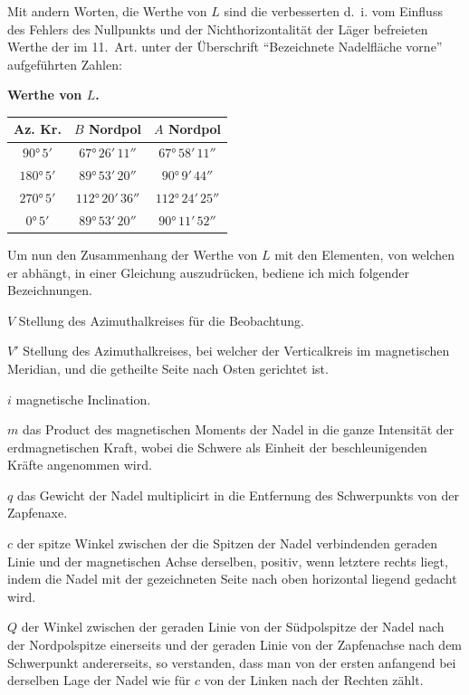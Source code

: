 \documentclass[12pt,a4paper]{article}
\begin{document}
Mit andern Worten, die Werthe von $L$ sind die verbesserten d.~i. vom Einfluss des Fehlers des Nullpunkts und der Nichthorizontalität der Läger befreieten Werthe der im 11.~Art. unter der Überschrift ``Bezeichnete Nadelfläche vorne'' aufgeführten Zahlen:

\begin{center}
\small
\textbf{Werthe von $L$.}
\begin{tabular}{|c|c|c|}
\hline
Az. Kr. & $B$ Nordpol & $A$ Nordpol \\
\hline
$90°\,5'$ & $67°\,26'\,11''$ & $67°\,58'\,11''$ \\
$180°\,5'$ & $89°\,53'\,20''$ & $90°\,9'\,44''$ \\
$270°\,5'$ & $112°\,20'\,36''$ & $112°\,24'\,25''$ \\
$0°\,5'$ & $89°\,53'\,20''$ & $90°\,11'\,52''$ \\
\hline
\end{tabular}
\end{center}

Um nun den Zusammenhang der Werthe von $L$ mit den Elementen, von welchen er abhängt, in einer Gleichung auszudrücken, bediene ich mich folgender Bezeichnungen.

$V$ Stellung des Azimuthalkreises für die Beobachtung.

$V'$ Stellung des Azimuthalkreises, bei welcher der Verticalkreis im magnetischen Meridian, und die getheilte Seite nach Osten gerichtet ist.

$i$ magnetische Inclination.

$m$ das Product des magnetischen Moments der Nadel in die ganze Intensität der erdmagnetischen Kraft, wobei die Schwere als Einheit der beschleunigenden Kräfte angenommen wird.

$q$ das Gewicht der Nadel multiplicirt in die Entfernung des Schwerpunkts von der Zapfenaxe.

$c$ der spitze Winkel zwischen der die Spitzen der Nadel verbindenden geraden Linie und der magnetischen Achse derselben, positiv, wenn letztere rechts liegt, indem die Nadel mit der gezeichneten Seite nach oben horizontal liegend gedacht wird.

$Q$ der Winkel zwischen der geraden Linie von der Südpolspitze der Nadel nach der Nordpolspitze einerseits und der geraden Linie von der Zapfenachse nach dem Schwerpunkt andererseits, so verstanden, dass man von der ersten anfangend bei derselben Lage der Nadel wie für $c$ von der Linken nach der Rechten zählt.
\end{document}
